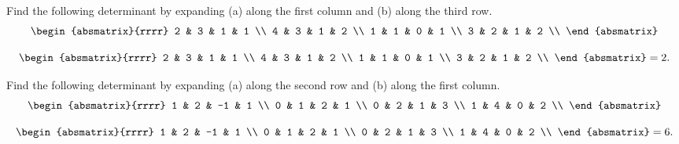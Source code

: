 \begin{ex}
  Find the following determinant by expanding (a) along the first
  column and (b) along the third row.
  \begin{equation*}
    \begin{absmatrix}{rrrr}
      2 & 3 & 1 & 1 \\
      4 & 3 & 1 & 2 \\
      1 & 1 & 0 & 1 \\
      3 & 2 & 1 & 2 \\
    \end{absmatrix}
  \end{equation*}
  \begin{sol}
    \begin{equation*}
      \begin{absmatrix}{rrrr}
      2 & 3 & 1 & 1 \\
      4 & 3 & 1 & 2 \\
      1 & 1 & 0 & 1 \\
      3 & 2 & 1 & 2 \\
      \end{absmatrix} =  2.
    \end{equation*}
  \end{sol}
\end{ex}

\begin{ex}
  Find the following determinant by expanding (a) along the second row
  and (b) along the first column.
  \begin{equation*}
    \begin{absmatrix}{rrrr}
      1 & 2 & -1 & 1 \\
      0 & 1 &  2 & 1 \\
      0 & 2 &  1 & 3 \\
      1 & 4 &  0 & 2 \\
    \end{absmatrix}
  \end{equation*}
  \begin{sol}
    \begin{equation*}
      \begin{absmatrix}{rrrr}
      1 & 2 & -1 & 1 \\
      0 & 1 &  2 & 1 \\
      0 & 2 &  1 & 3 \\
      1 & 4 &  0 & 2 \\
      \end{absmatrix} = 6.
    \end{equation*}
  \end{sol}
\end{ex}

